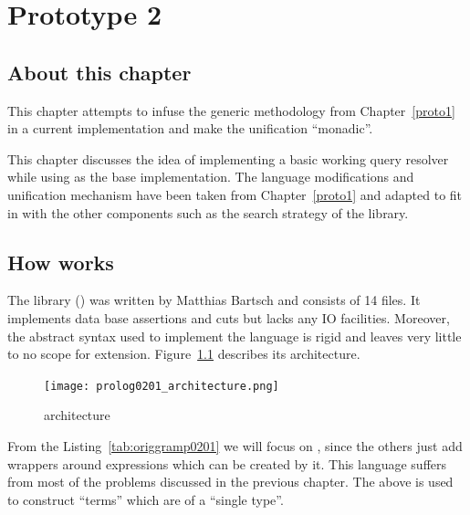 \documentclass[thesis-solanki.tex]{subfiles}
\begin{document}
\chapter{Prototype 2}{\label{proto2}}

\section{About this chapter}
This chapter attempts to infuse the generic methodology from Chapter~\ref{proto1} in a current 
implementation \cite{prolog-lib} and make the unification ``monadic''.

This chapter discusses the idea of implementing a basic working  query resolver while using
 \cite{prolog-lib} as the base implementation.
The language modifications and unification mechanism have been taken from Chapter~\ref{proto1} and adapted to fit
in with the other components such as the search strategy of the library.


\section{How \protect{} works}

The  library (\cite{prolog-lib}) was written by Matthias Bartsch and consists of 14
 files.
It implements data base assertions and cuts but lacks any IO facilities.
Moreover, the abstract syntax used to implement the language is rigid and leaves very little to no scope for
extension.
Figure~\ref{fig:prlg0201architecture} describes its architecture.

\begin{figure}[H]
\centering
\texttt{[image: prolog0201\_architecture.png]}
\caption{ \cite{prolog-lib} architecture}
\label{fig:prlg0201architecture}
\end{figure}

From the Listing~\ref{tab:origgramp0201} we will focus on , since the others just
add wrappers around expressions which can be created by it.
This language suffers from most of the problems discussed in the previous chapter.
The above is used to construct  ``terms'' which are of a ``single type''.
\end{document}

